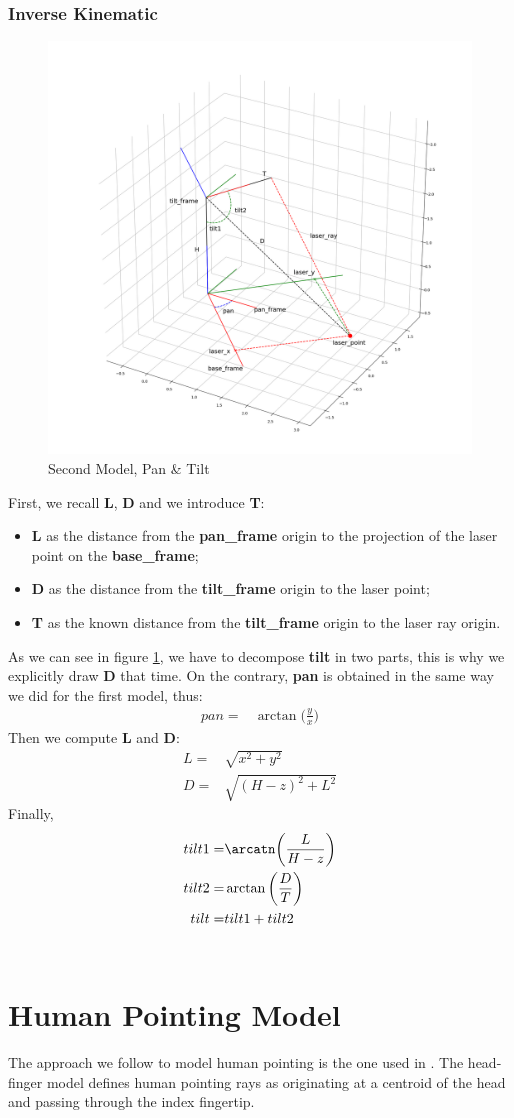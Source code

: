 \subsubsection{Inverse Kinematic}
\begin{figure}
	\centering
	\includegraphics[width=\textwidth]{img/model2XY.png}%
	\caption{Second Model, Pan \& Tilt}
	\label{fig:secondModelPanTilt}
\end{figure}
First, we recall \textbf{L}, \textbf{D} and we introduce \textbf{T}:
\begin{itemize}
    \item \textbf{L} as the distance from the \textbf{pan\_frame} origin to the projection of the laser point on the \textbf{base\_frame};
    \item \textbf{D} as the distance from the \textbf{tilt\_frame} origin to the laser point;
    \item \textbf{T} as the known distance from the \textbf{tilt\_frame} origin to the laser ray origin.
\end{itemize}
As we can see in figure \ref{fig:secondModelPanTilt}, we have to decompose \textbf{tilt} in two parts, this is why we explicitly draw \textbf{D} that time. On the contrary, \textbf{pan} is obtained in the same way we did for the first model, thus:
\begin{align}
	pan=& \arctan\bigg(\frac{y}{x}\bigg)\label{eq:panik2}
\end{align}
Then we compute \textbf{L} and \textbf{D}:
\begin{align}
	L=& \sqrt{x^2+y^2}\\
	D=& \sqrt{(H-z)^2 + L^2}
\end{align}
Finally,
\begin{align}
	tilt1 =& \arcatn\bigg(\frac{L}{H-z}\bigg)\\
	tilt2 =& \arctan\bigg(\frac{D}{T}\bigg)\\
	tilt =& tilt1 + tilt2
\end{align}
\\
\section{Human Pointing Model}
The approach we follow to model human pointing is the one used in \cite{gromov2018robot}. The head-finger model defines human pointing rays as originating at a centroid of the head and passing through the index fingertip. 
